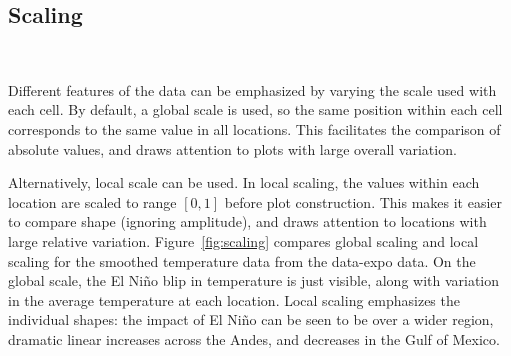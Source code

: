 \documentclass[oneside]{article}
\begin{document}




\subsection{Scaling}~\label{sec:scale}


Different features of the data can be emphasized by varying the scale used with each cell. By default, a global scale is used, so the same position within each cell corresponds to the same value in all locations. This facilitates the comparison of absolute values, and draws attention to plots with large overall variation.

Alternatively, local scale can be used. In local scaling, the values within each location are scaled to range $[0, 1]$ before plot construction. This makes it easier to compare shape (ignoring amplitude), and draws attention to locations with large relative variation. Figure~\ref{fig:scaling} compares global scaling and local scaling for the smoothed temperature data from the data-expo data. On the global scale, the El Ni\~no blip in temperature is just visible, along with variation in the average temperature at each location. Local scaling emphasizes the individual shapes: the impact of El Ni\~no can be seen to be over a wider region, dramatic linear increases across the Andes, and decreases in the Gulf of Mexico.
\end{document}
